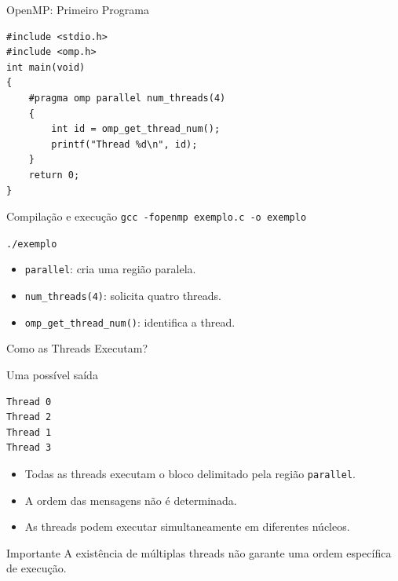 \documentclass[aspectratio=169,11pt]{beamer}
\begin{document}

\begin{frame}[fragile]{OpenMP: Primeiro Programa}

\small
\begin{verbatim}
#include <stdio.h>
#include <omp.h>
int main(void)
{
    #pragma omp parallel num_threads(4)
    {
        int id = omp_get_thread_num();
        printf("Thread %d\n", id);
    }
    return 0;
}
\end{verbatim}

\vspace{0.2cm}

\begin{block}{Compilação e execução}
\texttt{gcc -fopenmp exemplo.c -o exemplo}

\texttt{./exemplo}
\end{block}

\begin{itemize}
    \item \texttt{parallel}: cria uma região paralela.
    \item \texttt{num\_threads(4)}: solicita quatro threads.
    \item \texttt{omp\_get\_thread\_num()}: identifica a thread.
\end{itemize}

\end{frame}



\begin{frame}[fragile]{Como as Threads Executam?}

\begin{block}{Uma possível saída}
\small
\begin{verbatim}
Thread 0
Thread 2
Thread 1
Thread 3
\end{verbatim}
\end{block}

\vspace{0.3cm}

\begin{itemize}
    \setlength{\itemsep}{0.25cm}
    \item Todas as threads executam o bloco
          delimitado pela região \texttt{parallel}.
    \item A ordem das mensagens não é determinada.
    \item As threads podem executar simultaneamente
          em diferentes núcleos.
\end{itemize}

\vspace{0.3cm}

\begin{alertblock}{Importante}
A existência de múltiplas threads não garante
uma ordem específica de execução.
\end{alertblock}

\end{frame}
\end{document}
